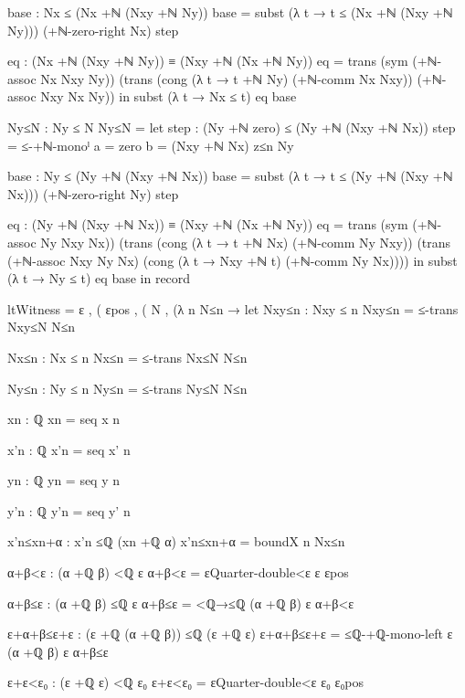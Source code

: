 \documentclass[11pt,a4paper]{book}
\begin{document}
\begin{code}
        base : Nx ≤ (Nx +ℕ (Nxy +ℕ Ny))
        base = subst (λ t → t ≤ (Nx +ℕ (Nxy +ℕ Ny))) (+ℕ-zero-right Nx) step

        eq : (Nx +ℕ (Nxy +ℕ Ny)) ≡ (Nxy +ℕ (Nx +ℕ Ny))
        eq =
          trans
            (sym (+ℕ-assoc Nx Nxy Ny))
            (trans
              (cong (λ t → t +ℕ Ny) (+ℕ-comm Nx Nxy))
              (+ℕ-assoc Nxy Nx Ny))
      in
      subst (λ t → Nx ≤ t) eq base

    Ny≤N : Ny ≤ N
    Ny≤N =
      let
        step : (Ny +ℕ zero) ≤ (Ny +ℕ (Nxy +ℕ Nx))
        step = ≤-+ℕ-monoˡ {a = zero} {b = (Nxy +ℕ Nx)} z≤n Ny

        base : Ny ≤ (Ny +ℕ (Nxy +ℕ Nx))
        base = subst (λ t → t ≤ (Ny +ℕ (Nxy +ℕ Nx))) (+ℕ-zero-right Ny) step

        eq : (Ny +ℕ (Nxy +ℕ Nx)) ≡ (Nxy +ℕ (Nx +ℕ Ny))
        eq =
          trans
            (sym (+ℕ-assoc Ny Nxy Nx))
            (trans
              (cong (λ t → t +ℕ Nx) (+ℕ-comm Ny Nxy))
              (trans
                (+ℕ-assoc Nxy Ny Nx)
                (cong (λ t → Nxy +ℕ t) (+ℕ-comm Ny Nx))))
      in
      subst (λ t → Ny ≤ t) eq base
  in
  record
    { ltWitness =
        ε ,
        ( εpos
        , ( N
          , (λ n N≤n →
              let
                Nxy≤n : Nxy ≤ n
                Nxy≤n = ≤-trans Nxy≤N N≤n

                Nx≤n : Nx ≤ n
                Nx≤n = ≤-trans Nx≤N N≤n

                Ny≤n : Ny ≤ n
                Ny≤n = ≤-trans Ny≤N N≤n

                xn : ℚ
                xn = seq x n

                x'n : ℚ
                x'n = seq x' n

                yn : ℚ
                yn = seq y n

                y'n : ℚ
                y'n = seq y' n

                x'n≤xn+α : x'n ≤ℚ (xn +ℚ α)
                x'n≤xn+α = boundX n Nx≤n

                α+β<ε : (α +ℚ β) <ℚ ε
                α+β<ε = εQuarter-double<ε ε εpos

                α+β≤ε : (α +ℚ β) ≤ℚ ε
                α+β≤ε = <ℚ→≤ℚ {(α +ℚ β)} {ε} α+β<ε

                ε+α+β≤ε+ε : (ε +ℚ (α +ℚ β)) ≤ℚ (ε +ℚ ε)
                ε+α+β≤ε+ε = ≤ℚ-+ℚ-mono-left ε (α +ℚ β) ε α+β≤ε

                ε+ε<ε₀ : (ε +ℚ ε) <ℚ ε₀
                ε+ε<ε₀ = εQuarter-double<ε ε₀ ε₀pos

}
\end{code}
\end{document}
